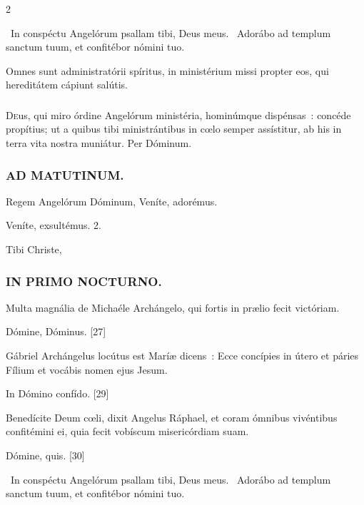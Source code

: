 \documentclass[9pt,twoside]{extarticle}
\begin{document}
\begin{multicols}{2}
{{\begin{tightlist}{}
\item {}~In conspéctu Angelórum psallam tibi, Deus meus. ~Adorábo ad templum sanctum tuum, et confitébor nómini tuo.
\item {} Omnes sunt administratórii spíritus, in ministérium missi propter eos, qui hereditátem cápiunt salútis.
\end{tightlist}

\subsubsection*{\center {}}
\lettrine{D}eus, qui miro órdine Angelórum ministéria, hominúmque dispénsas~: concéde propítius; ut a quibus tibi ministrántibus in cœlo semper assístitur, ab his in terra vita nostra muniátur. Per Dóminum.

\subsubsection*{\center \textsc{AD MATUTINUM.}}
\begin{tightlist}{}
\item {} Regem Angelórum Dóminum, \textred{*} Veníte, adorémus.
\item {} Veníte, exsultémus. 2.
\item {} Tibi Christe, 
\end{tightlist}

\subsubsection*{\center \textsc{IN PRIMO NOCTURNO.}}
\begin{tightlist}{}
\item {} Multa magnália de Michaéle Archángelo, qui fortis in prælio fecit victóriam.
\item {} Dómine, Dóminus. [27]
\item {} Gábriel Archángelus locútus est Maríæ dicens~: Ecce concípies in útero et páries Fílium et vocábis nomen ejus Jesum.
\item {} In Dómino confído. [29]
\item {} Benedícite Deum cœli, dixit Angelus Ráphael, et coram ómnibus vivéntibus confitémini ei, quia fecit vobíscum misericórdiam suam.
\item {} Dómine, quis. [30]
\item {}~In conspéctu Angelórum psallam tibi, Deus meus. ~Adorábo ad templum sanctum tuum, et confitébor nómini tuo.
\item {}
\end{tightlist}

}}
\end{multicols}
\end{document}
